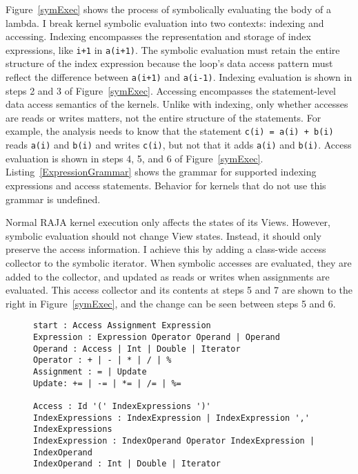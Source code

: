Figure~\ref{symExec} shows the process of symbolically evaluating the body of a lambda. 
I break kernel symbolic evaluation into two contexts: indexing and accessing. 
Indexing encompasses the representation and storage of index expressions, like
\verb.i+1. in \verb.a(i+1)..
The symbolic evaluation must retain the entire structure of the index expression 
because the loop's
data access pattern must reflect the difference between \verb.a(i+1). and
\verb.a(i-1)..
Indexing evaluation is shown in steps 2 and 3 of Figure~\ref{symExec}.
Accessing encompasses the statement-level data access semantics of the kernels.
Unlike with indexing, only whether accesses are reads or writes matters,
not the entire structure of the statements.
For example, the analysis needs to know that the statement \verb.c(i) = a(i) + b(i).
reads \verb.a(i). and \verb.b(i). and writes \verb.c(i)., but not that it
adds \verb.a(i). and \verb.b(i)..
Access evaluation is shown in steps 4, 5, and 6 of Figure~\ref{symExec}.
Listing~\ref{ExpressionGrammar} shows the grammar for supported indexing expressions and access statements. 
Behavior for kernels that do not use this grammar is undefined.

Normal RAJA kernel execution only affects the states of its Views. 
However, symbolic evaluation should not change View states. 
Instead, it should only preserve the access information.
I achieve this by adding a class-wide access collector to the symbolic iterator. 
When symbolic accesses are evaluated, they are added to the collector, and updated as reads or writes when assignments are evaluated.
This access collector and its contents at steps 5 and 7 are shown to the right in Figure~\ref{symExec}, and the change can be seen between steps 5 and 6.


\begin{figure}[t]
\begin{lstlisting}[label={ExpressionGrammar},caption={EBNF Grammar to Support Symbolic Evaluation}]
start : Access Assignment Expression
Expression : Expression Operator Operand | Operand
Operand : Access | Int | Double | Iterator
Operator : + | - | * | / | %
Assignment : = | Update
Update: += | -= | *= | /= | %=

Access : Id '(' IndexExpressions ')'
IndexExpressions : IndexExpression | IndexExpression ',' IndexExpressions
IndexExpression : IndexOperand Operator IndexExpression | IndexOperand
IndexOperand : Int | Double | Iterator
\end{lstlisting}
\end{figure}
	

